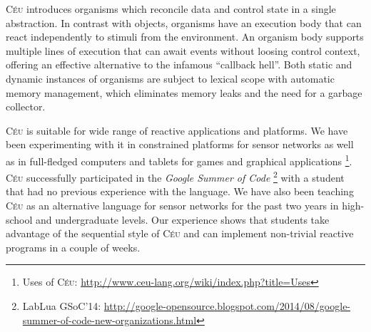 \documentclass{sigplanconf}
\newcommand{\CEU}{\textsc{C\'{e}u}\xspace}
\newcommand{\1}{\;}
\newcommand{\2}{\;\;}
\newcommand{\3}{\;\;\;}
\newcommand{\5}{\;\;\;\;\;}
\newcommand{\URL}{\small\url}
\begin{document}
\CEU introduces organisms which reconcile data and control state in a single 
abstraction.
%
In contrast with objects, organisms have an execution body that can react 
independently to stimuli from the environment.
An organism body supports multiple lines of execution that can await events 
without loosing control context, offering an effective alternative to the 
infamous ``callback hell''.
%
Both static and dynamic instances of organisms are subject to lexical scope 
with automatic memory management, which eliminates memory leaks and the need 
for a garbage collector.

\CEU is suitable for wide range of reactive applications and platforms.
%
We have been experimenting with it in constrained platforms for sensor networks 
as well as in full-fledged computers and tablets for games and graphical 
applications%
\footnote{Uses of \CEU: \URL{http://www.ceu-lang.org/wiki/index.php?title=Uses}}.
%
\CEU successfully participated in the \emph{Google Summer of Code}%
\footnote{LabLua GSoC'14: 
\small{\URL{http://google-opensource.blogspot.com/2014/08/google-summer-of-code-new-organizations.html}}}
with a student that had no previous experience with the language.
%
We have also been teaching \CEU as an alternative language for sensor networks 
for the past two years in high-school and undergraduate levels.
%
Our experience shows that students take advantage of the sequential style of 
\CEU and can implement non-trivial reactive programs in a couple of weeks.




\end{document}
